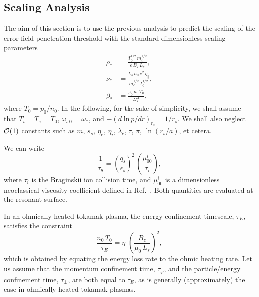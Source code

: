 \documentclass[12pt,prb,aps]{revtex4-1}
\begin{document}
\subsection{Scaling Analysis}
The aim of this section is to use the previous analysis to predict the scaling of the error-field penetration
threshold with the standard dimensionless scaling parameters\,\cite{connor}
\begin{align}
\rho_\ast &= \frac{T_0^{1/2}\,m_i^{1/2}}{e\,B_z\,L_s},\label{e428}\\[0.5ex]
\nu_\ast &= \frac{L_s\,n_0\,e^2\,\eta_\parallel}{m_e^{1/2}\,T_0^{1/2}},\\[0.5ex]
\beta_\ast&=\frac{\mu_0\,n_0\,T_0}{B_z^{\,2}},\label{e430}
\end{align}
where $T_0=p_0/n_0$. In the following, for the sake of simplicity, we
shall assume that $T_i=T_e=T_0$, $\omega_{s\,0}=\omega_\ast$, and $-(d\ln p/dr)_{r_s} = 1/r_s$. We shall also neglect ${\cal O}(1)$
constants such as $m$, $s_s$, $\eta_e$, $\eta_i$, $\lambda_e$, $\tau$, $\pi$, $\ln(r_s/a)$, et cetera.

We can  write 
\begin{equation}
\frac{1}{\tau_{\theta}} = \left(\frac{q_s}{\epsilon_s}\right)^2\,\left(\frac{\mu_{00}^i}{\tau_{i}}\right),
\end{equation}
 where
$\tau_i$ is the Braginskii ion collision time, and $\mu_{00}^i$ is a dimensionless neoclassical viscosity coefficient defined in Ref.~. Both quantities are evaluated at the resonant surface. 

In an ohmically-heated tokamak
plasma, the energy confinement timescale, $\tau_E$, satisfies the constraint
\begin{equation}
\frac{n_0\,T_0}{\tau_E} = \eta_\parallel\left(\frac{B_z}{\mu_0\,L_s}\right)^2,
\end{equation}
which is obtained by equating the energy loss rate to the ohmic heating rate. Let us assume that the momentum confinement
time, $\tau_\varphi$, and the particle/energy confinement time, $\tau_\perp$, are both equal to $\tau_E$, as is generally
(approximately) the case in ohmically-heated tokamak plasmas.\cite{iter} 
\end{document}
